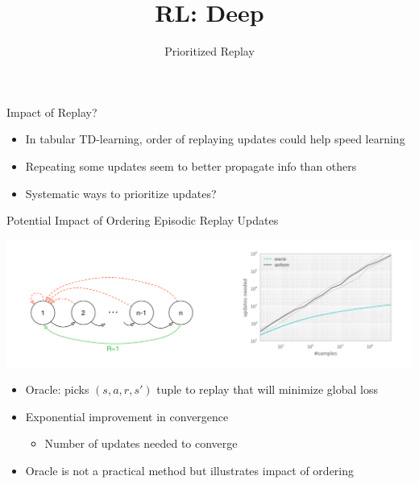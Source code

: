 \documentclass[aspectratio=169]{../latex_main/tntbeamer}  %
\title[RL: Deep Reinforcement Learning]{RL: Deep}
\subtitle{Prioritized Replay}
\begin{document}
	
	\maketitle

\begin{frame}[c]{Impact of Replay?}
	

\begin{itemize}
	\item In tabular TD-learning, \alert{order} of replaying updates could help speed
	learning
	\item Repeating some updates seem to better propagate info than others
	\item Systematic ways to prioritize updates?
\end{itemize}
	
\end{frame}
\begin{frame}[c]{Potential Impact of Ordering Episodic Replay Updates }
	
	\includegraphics[width=1.0\textwidth]{images/oracle_replay.png}
	
	\begin{itemize}
		\item Oracle: picks $(s, a, r , s' )$ tuple to replay that will minimize global loss
		\item Exponential improvement in convergence
		\begin{itemize}
			\item 		Number of updates needed to converge
		\end{itemize}
		\item Oracle is not a practical method but illustrates impact of ordering
	\end{itemize}
	
\end{frame}
\end{document}
